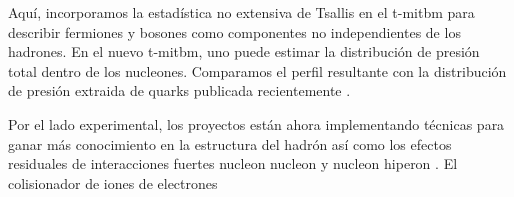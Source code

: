 
Aquí, incorporamos la estadística no extensiva de Tsallis en el \acrshort{t-mitbm} para describir fermiones y bosones como componentes no independientes de los hadrones. En el nuevo \acrshort{t-mitbm}, uno puede estimar la distribución de presión total dentro de los nucleones. Comparamos el perfil resultante con la distribución de presión extraida de quarks publicada recientemente \cite{Burkert_2018}.


Por el lado experimental, los proyectos están ahora implementando técnicas para ganar más conocimiento en la estructura del hadrón\cite{PhysRevLett.100.162002} así como los efectos residuales de interacciones fuertes nucleon nucleon y nucleon hiperon \cite{Collaboration2015,Mihaylov_2021}. El colisionador de iones de electrones 

